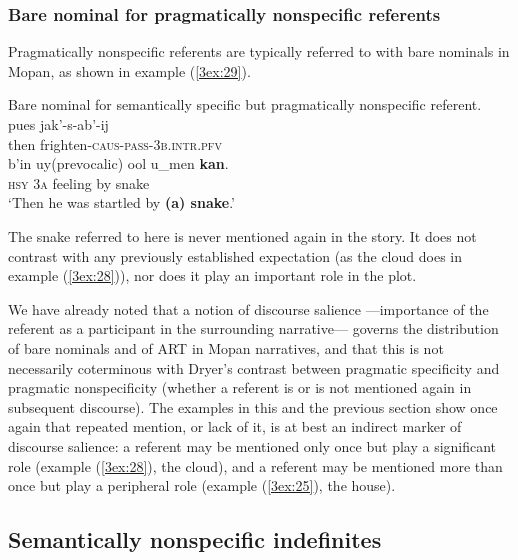 \documentclass[output=paper]{langsci/langscibook}
\begin{document}
\subsubsection{Bare nominal for pragmatically nonspecific referents}\label{3sec:344}

Pragmatically nonspecific referents are typically referred to with bare nominals in Mopan, as shown in example (\ref{3ex:29}).

\begin{exe}
\ex\label{3ex:29}
{Bare nominal for semantically specific but pragmatically nonspecific referent.} 
\exi{}
\gll	pues		jak'-s-ab'-ij \\
	then		frighten-{\textsc{caus-pass-3b.intr.pfv}} \\
\glt
\exi{}
\gll 	b'in		uy(prevocalic)		ool 		u\_men	{\textbf{kan}}.  \\
	{\textsc{hsy}}	{\textsc{3a}} 			feeling	by 		snake \\
\glt	`Then he was startled by {\textbf{(a) snake}}.'
\end{exe}

The snake referred to here is never mentioned again in the story.  It does not contrast with any previously established expectation (as the cloud does in example (\ref{3ex:28})), nor does it play an important role in the plot.

We have already noted that a notion of discourse salience ---importance of the referent as a participant in the surrounding narrative--- governs the distribution of bare nominals and of ART in Mopan narratives, and that this is not necessarily coterminous with Dryer's contrast between pragmatic specificity and pragmatic nonspecificity (whether a referent is or is not mentioned again in subsequent discourse). The examples in this and the previous section show once again that repeated mention, or lack of it, is at best an indirect marker of discourse salience: a referent may be mentioned only once but play a significant role (example (\ref{3ex:28}), the cloud), and a referent may be mentioned more than once but play a peripheral role (example (\ref{3ex:25}), the house).

\subsection{Semantically nonspecific indefinites}\label{3sec:35}
\end{document}
